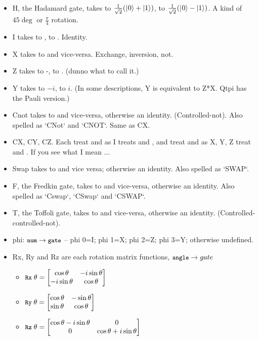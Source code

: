 \documentclass[11pt,a4paper]{article}
\newcommand{\verbtt}[1]{\texttt{\small{}#1}}
\begin{document}
\begin{itemize}
\item  H, the Hadamard gate, takes \zero{} to $\frac{1}{\sqrt{2}}(|\hspace{0.5pt}0\rangle+|1\rangle)$, \one{} to $\frac{1}{\sqrt{2}}(|\hspace{0.5pt}0\rangle-|1\rangle)$. A kind of $45\deg$ or $\frac{\pi}{4}$ rotation.
\item I takes \zero{} to \zero, \one{} to \one. Identity.
\item X  takes \zero{} to \one{} and vice-versa. Exchange, inversion, not.
\item Z  takes \zero{} to -\one, \one{} to \zero{}. (dunno what to call it.)
\item Y  takes \zero{} to $-i$\one{}, \one{} to $i$\zero{}. (In some descriptions, Y is equivalent to Z*X. Qtpi has the Pauli version.)
\item Cnot takes \onezero{} to \oneone{} and vice-versa, otherwise an identity. (Controlled-not). Also spelled as `CNot` and `CNOT`. Same as CX.
\item CX, CY, CZ. Each treat \zerozero and \zeroone as I treats \zero and \one, and treat \onezero and \oneone as X, Y, Z treat \zero and \one. If you see what I mean ...
\item Swap takes \zeroone to \onezero and vice versa; otherwise an identity. Also spelled as `SWAP`.
\item F, the Fredkin gate, takes \onezeroone{} to \oneonezero{} and vice-versa, otherwise an identity. Also spelled as `Cswap`, `CSwap` and `CSWAP`.
\item T, the Toffoli gate, takes \oneonezero{} to \oneoneone{} and vice-versa, otherwise an identity. (Controlled-controlled-not). \vspace{5pt}

\item phi: $\verbtt{num}->\verbtt{gate}$ -- phi 0=I; phi 1=X; phi 2=Z; phi 3=Y; otherwise undefined. \vspace{5pt}

\item Rx, Ry and Rz are each rotation matrix functions, $\verbtt{angle}->gate$
  \begin{itemize}
  \item $\verbtt{Rx}\;\theta = \qgate{\cos\theta}{-i\sin\theta}{-i\sin\theta}{\cos\theta}$
  \item $\verbtt{Ry}\;\theta = \qgate{\cos\theta}{-\sin\theta}{\sin\theta}{\cos\theta}$
  \item $\verbtt{Rz}\;\theta = \qgate{\cos\theta-i\sin\theta}{0}{0}{\cos\theta+i\sin\theta}$
  \end{itemize}
\end{itemize}
  
\end{document}
